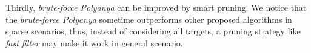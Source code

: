 Thirdly, \textit{brute-force Polyanya} can be improved by smart pruning. We notice that
the \textit{brute-force Polyanya} sometime outperforms other proposed algorithms in sparse scenarios,
thus, instead of considering all targets,
a pruning strategy like \textit{fast filter}\cite{xia2004fast} may make it work in general
scenario.
